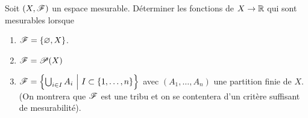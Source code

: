 \begin{td-exo}
    Soit \((X, \mathscr{F})\) un espace mesurable. Déterminer les fonctions de \(X \to \mathbb{R}\) qui sont mesurables lorsque 
    \begin{enumerate}
        \item  \(\mathscr{F} = \left\{ \varnothing, X \right\}\).
        \item  \(\mathscr{F} = \mathscr{P}(X)\) 
        \item \(\scr F=\Bigl\{\bigcup_{i\in I}A_i\ \Bigl|\ I\subset\{1,\dots,n\}\Bigr\}\)  avec  \((A_1,\dots,A_n)\) une partition finie de \(X\). (On montrera que \(\mathscr{F}\) est une tribu et on se contentera d'un critère suffisant de mesurabilité).
    \end{enumerate}
    
\end{td-exo}
